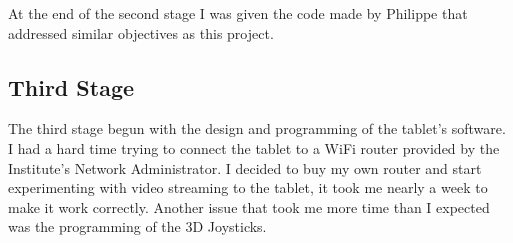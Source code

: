 At the end of the second stage I was given the code made by Philippe that addressed similar objectives as this project.

\subsection{Third Stage}
The third stage begun with the design and programming of the tablet's software. I had a hard time trying to connect the tablet to a WiFi router provided by the Institute's Network Administrator. I decided to buy my own router and start experimenting with video streaming to the tablet, it took me nearly a week to make it work correctly. Another issue that took me more time than I expected was the programming of the 3D Joysticks. 